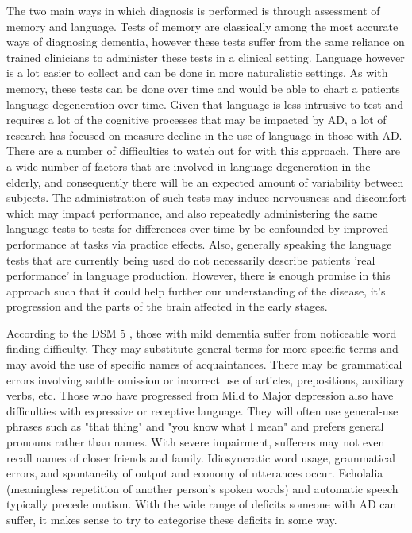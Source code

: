 \documentclass{article}
\begin{document}
The two main ways in which diagnosis is performed is through assessment of memory and language. Tests of memory are classically among the most accurate ways of diagnosing dementia, however these tests suffer from the same reliance on trained clinicians to administer these tests in a clinical setting. Language however is a lot easier to collect and can be done in more naturalistic settings. As with memory, these tests can be done over time and would be able to chart a patients language degeneration over time. Given that language is less intrusive to test and requires a lot of the cognitive processes that may be impacted by AD, a lot of research has focused on measure decline in the use of language in those with AD. There are a number of difficulties to watch out for with this approach. There are a wide number of factors that are involved in language degeneration in the elderly, and consequently there will be an expected amount of variability between subjects. The administration of such tests may induce nervousness and discomfort which may impact performance, and also repeatedly administering the same language tests to tests for differences over time by be confounded by improved performance at tasks via practice effects. Also, generally speaking the language tests that are currently being used do not necessarily describe patients 'real performance' in language production. However, there is enough promise in this approach such that it could help further our understanding of the disease, it's progression and the parts of the brain affected in the early stages.
\par
According to the DSM 5 \cite{AmericanPsychiatricAssociation2013}, those with mild dementia suffer from noticeable word finding difficulty. They may substitute general terms for more specific terms and may avoid the use of specific names of acquaintances. There may be grammatical errors involving subtle omission or incorrect use of articles, prepositions, auxiliary verbs, etc. Those who have progressed from Mild to Major depression also have difficulties with expressive or receptive language. They will often use general-use phrases such as "that thing" and "you know what I mean" and prefers general pronouns rather than names. With severe impairment, sufferers may not even recall names of closer friends and family. Idiosyncratic word usage, grammatical errors, and spontaneity of output and economy of utterances occur. Echolalia (meaningless repetition of another person's spoken words) and automatic speech typically precede mutism. With the wide range of deficits someone with AD can suffer, it makes sense to try to categorise these deficits in some way.
\end{document}
